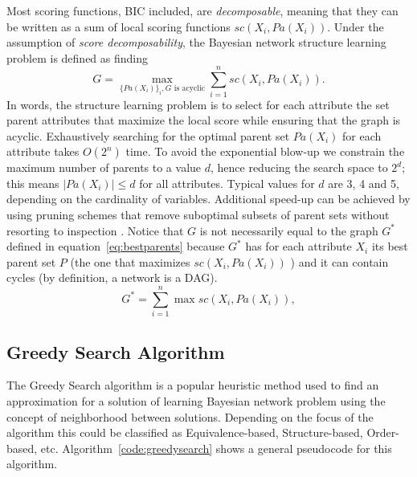         Most scoring functions, BIC included, are \emph{decomposable}, meaning that they can be written as a sum of local scoring functions $sc(X_i, {Pa}(X_i))$. Under the assumption of \emph{score decomposability}, the Bayesian network structure learning problem is defined as finding
        \begin{equation}
        		\label{eq:decomposability}
		G = \max_{\{ {Pa}(X_i)\}_i, G \text{ is acyclic}} \sum_{i=1}^n {sc}( X_i , {Pa}( X_i ) ) .
	\end{equation}
In words, the structure learning problem is to select for each attribute the set parent attributes that maximize the local score while ensuring that the graph is acyclic. Exhaustively searching for the optimal parent set ${Pa}( X_i)$ for each attribute takes $O(2^n)$ time. To avoid the exponential blow-up we constrain the maximum number of parents to a value $d$, hence reducing the search space to $2^d$; this means $|{Pa}( X_i )| \leq d$ for all attributes. Typical values for $d$ are 3, 4 and 5, depending on the cardinality of variables. Additional speed-up can be achieved by using pruning schemes that remove suboptimal subsets of parent sets without resorting to inspection \cite{Cassio11}. Notice that $G$ is not necessarily equal to the graph $G^*$ defined in equation~\ref{eq:bestparents} because $G^*$ has for each attribute $X_i$ its best parent set $P$ (the one that maximizes ${sc}( X_i , {Pa}( X_i ) )$ ) and it can contain cycles (by definition, a network is a DAG).
	\begin{equation}
		\label{eq:bestparents}
		G^* = \sum_{i=1}^{n} \max {sc}( X_i , {Pa}( X_i ) ) ,
	\end{equation}

\subsection{Greedy Search Algorithm}
\label{subsec:greedysearch}

The Greedy Search algorithm is a popular heuristic method used to find an approximation for a solution of  learning Bayesian network problem using the concept of neighborhood between solutions. Depending on the focus of the algorithm this could be classified as Equivalence-based, Structure-based, Order-based, etc. Algorithm~\ref{code:greedysearch} shows a general pseudocode for this algorithm.

